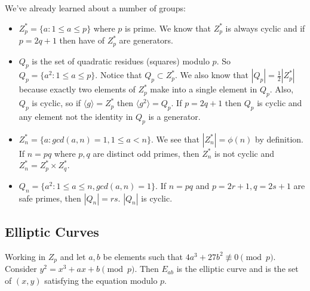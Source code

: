 \documentclass[psamsfonts]{amsart}
\begin{document}
We've already learned about a number of groups:
\begin{itemize}
  \item $Z_{p}^* = \{a : 1 \leq a \leq p \}$ where $p$ is prime. We know that $Z_{p}^*$ is always cyclic and if $p=2q+1$ then have of $Z_p^*$ are generators.
  \item $Q_p$ is the set of quadratic residues (squares) modulo $p$. So $Q_p = \{a^2 : 1 \leq a \leq p \}$. Notice that $Q_p \subset Z_p^*$. We also know that $|Q_p| = \frac{1}{2} |Z_p^*|$ because exactly two elements of $Z_p^*$ make into a single element in $Q_p$. Also, $Q_p$ is cyclic, so if $\langle g \rangle = Z_p^*$ then $\langle g^2 \rangle = Q_p$. If $p = 2q + 1$ then $Q_p$ is cyclic and any element not the identity in $Q_p$ is a generator.
  \item $Z_n^* = \{a : gcd(a,n) = 1, 1 \leq a < n \}$. We see that $|Z_{n}^*| = \phi(n)$ by definition. If $n = pq$ where $p,q$ are distinct odd primes, then $Z_n^*$ is not cyclic and $Z_n^* = Z_p^* \times Z_q^*$. 
  \item $Q_n = \{a^2 : 1 \leq a \leq n, gcd(a,n) = 1 \}$. If $n = pq$ and $p = 2r+1, q = 2s+1$ are safe primes, then $|Q_n| = rs$. $|Q_n|$ is cyclic.
\end{itemize}

\subsection{Elliptic Curves}

Working in $Z_p$ and let $a,b$ be elements such that $4a^3 + 27b^2 \not \equiv 0 \pmod{p}$. Consider $y^2 = x^3 +ax + b \pmod{p}$. Then $E_{ab}$ is the elliptic curve and is the set of $(x,y)$ satisfying the equation modulo $p$. 
\end{document}
